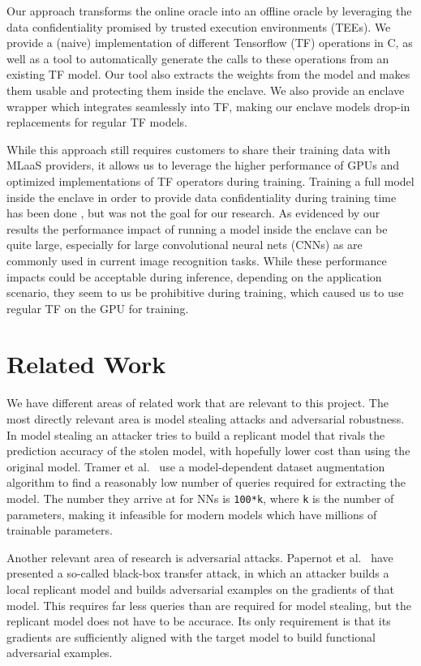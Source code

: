 \documentclass[11pt]{article}
\begin{document}
Our approach transforms the online oracle into an offline oracle by leveraging the data confidentiality promised by trusted execution environments (TEEs).
We provide a (naive) implementation of different Tensorflow (TF) operations in C, as well as a tool to automatically generate the calls to these operations from an existing TF model.
Our tool also extracts the weights from the model and makes them usable and protecting them inside the enclave.
We also provide an enclave wrapper which integrates seamlessly into TF, making our enclave models drop-in replacements for regular TF models.

While this approach still requires customers to share their training data with MLaaS providers, it allows us to leverage the higher performance of GPUs and optimized implementations of TF operators during training.
Training a full model inside the enclave in order to provide data confidentiality during training time has been done \cite{ohrimenko_oblivious_2016}, but was not the goal for our research.
As evidenced by our results the performance impact of running a model inside the enclave can be quite large, especially for large convolutional neural nets (CNNs) as are commonly used in current image recognition tasks.
While these performance impacts could be acceptable during inference, depending on the application scenario, they seem to us be prohibitive during training, which caused us to use regular TF on the GPU for training.

\section{Related Work}
\label{sec:related}

We have different areas of related work that are relevant to this project.
The most directly relevant area is model stealing attacks and adversarial robustness.
In model stealing an attacker tries to build a replicant model that rivals the prediction accuracy of the stolen model, with hopefully lower cost than using the original model.
Tramer et al.~\cite{tramer_stealing_2016} use a model-dependent dataset augmentation algorithm to find a reasonably low number of queries required for extracting the model.
The number they arrive at for NNs is \texttt{100*k}, where \texttt{k} is the number of parameters, making it infeasible for modern models which have millions of trainable parameters.

Another relevant area of research is adversarial attacks.
Papernot et al.~\cite{papernot_practical_2017} have presented a so-called black-box transfer attack, in which an attacker builds a local replicant model and builds adversarial examples on the gradients of that model.
This requires far less queries than are required for model stealing, but the replicant model does not have to be accurace.
Its only requirement is that its gradients are sufficiently aligned with the target model to build functional adversarial examples.
\end{document}
